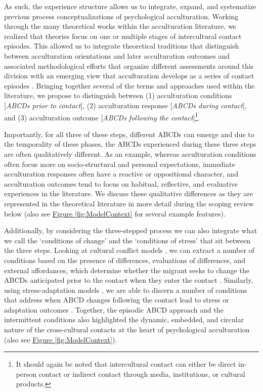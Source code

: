 \documentclass[man, 12pt, a4paper, mask]{apa7}
\newcommand{\fgrref}[2][]{\hyperref[#2]{Figure \ref*{#2}#1}}
\begin{document}
As such, the experience structure allows us to integrate, expand, and systematize previous process conceptualizations of psychological acculturation. Working through the many theoretical works within the acculturation literature, we realized that theories focus on one or multiple stages of intercultural contact episodes. This allowed us to integrate theoretical traditions that distinguish between acculturation orientations and later acculturation outcomes \citep[e.g.,][]{TeLindert2008a} and associated methodological efforts that organize different assessments around this division \citep[notably][]{Arends-Toth2006a} with an emerging view that acculturation develops as a series of contact episodes \citep[][]{Maertz2016}. Bringing together several of the terms and approaches used within the literature, we propose to distinguish between (1) acculturation conditions [\textit{ABCDs prior to contact}], (2) acculturation response [\textit{ABCDs during contact}], and (3) acculturation outcome [\textit{ABCDs following the contact}]\footnote{It should again be noted that intercultural contact can either be direct in-person contact or indirect contact through media, institutions, or cultural products.}. 

Importantly, for all three of these steps, different ABCDs can emerge and due to the temporality of these phases, the ABCDs experienced during these three steps are often qualitatively different. As an example, whereas acculturation conditions often focus more on socio-structural and personal expectations, immediate acculturation responses often have a reactive or oppositional character, and acculturation outcomes tend to focus on habitual, reflective, and evaluative experiences in the literature. We discuss these qualitative differences as they are represented in the theoretical literature in more detail during the scoping review below (also see \fgrref{fig:ModelContext} for several example features).

Additionally, by considering the three-stepped process we can also integrate what we call the `conditions of change' and the `conditions of stress' that sit between the three steps. Looking at cultural conflict models \citep[e.g.,][]{Robinson2019}, we can extract a number of conditions based on the presence of differences, evaluations of differences, and external affordances, which determine whether the migrant seeks to change the ABCDs anticipated prior to the contact when they enter the contact \citep[also see][]{Masgoret2006, Alitolppa-Niitamo2004, Grove1985, Wood2014}. Similarly, using stress-adaptation models \citep[e.g.,][]{Kim1988, Hajro2019, Sam2006b}, we are able to discern a number of conditions that address when ABCD changes following the contact lead to stress or adaptation outcomes \citep[also see][]{Ryan2008, Berry1992, Benet-Martinez2005, Salo2015, Wood2014, Hajro2019}. Together, the episodic ABCD approach and the intermittent conditions also highlighted the dynamic, embedded, and circular nature of the cross-cultural contacts at the heart of psychological acculturation (also see \fgrref{fig:ModelContext}).
\end{document}
